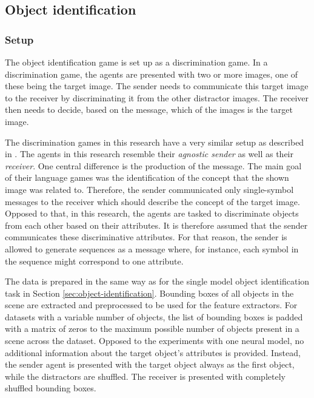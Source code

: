 \subsection{Object identification}
\label{sec:language-games:identification}

\subsubsection*{Setup}

The object identification game is set up as a discrimination game.
In a discrimination game, the agents are presented with two or more images, one of these being the target image.
The sender needs to communicate this target image to the receiver by discriminating it from the other distractor images.
The receiver then needs to decide, based on the message, which of the images is the target image.

The discrimination games in this research have a very similar setup as described in \citep{Lazaridou2017}.
The agents in this research resemble their \emph{agnostic sender} as well as their \emph{receiver}.
One central difference is the production of the message.
The main goal of their language games was the identification of the concept that the shown image was related to.
Therefore, the sender communicated only single-symbol messages to the receiver which should describe the concept of the target image.
Opposed to that, in this research, the agents are tasked to discriminate objects from each other based on their attributes.
It is therefore assumed that the sender communicates these discriminative attributes.
For that reason, the sender is allowed to generate sequences as a message where, for instance, each symbol in the sequence might correspond to one attribute.

The data is prepared in the same way as for the single model object identification task in Section \ref{sec:object-identification}.
Bounding boxes of all objects in the scene are extracted and preprocessed to be used for the feature extractors.
For datasets with a variable number of objects, the list of bounding boxes is padded with a matrix of zeros to the maximum possible number of objects present in a scene across the
dataset.
Opposed to the experiments with one neural model, no additional information about the target object's attributes is provided.
Instead, the sender agent is presented with the target object always as the first object, while the distractors are shuffled.
The receiver is presented with completely shuffled bounding boxes.

